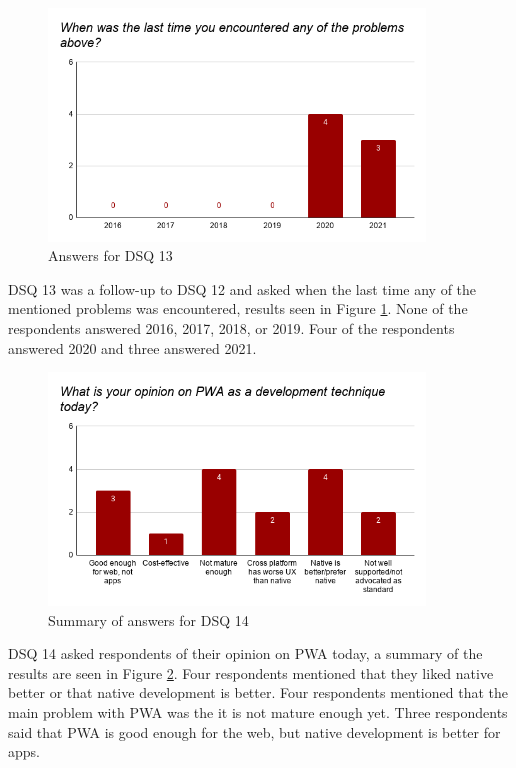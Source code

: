 \documentclass[a4paper,12pt]{article}
\begin{document}
\begin{figure}[ht!]
    \centering
    \includegraphics[width=10cm]{img/Results/dsq13.png}
    \caption{Answers for DSQ 13}
    \label{fig:res_devq13}
\end{figure}

DSQ 13 was a follow-up to DSQ 12 and asked when the last time any of the mentioned problems was encountered, results seen in Figure \ref{fig:res_devq13}. None of the respondents answered 2016, 2017, 2018, or 2019. Four of the respondents answered 2020 and three answered 2021.

\begin{figure}[ht!]
    \centering
    \includegraphics[width=10cm]{img/Results/dsq14.png}
    \caption{Summary of answers for DSQ 14}
    \label{fig:res_devq14}
\end{figure}

\newpage
DSQ 14 asked respondents of their opinion on PWA today, a summary of the results are seen in Figure \ref{fig:res_devq14}. Four respondents mentioned that they liked native better or that native development is better. Four respondents mentioned that the main problem with PWA was the it is not mature enough yet. Three respondents said that PWA is good enough for the web, but native development is better for apps.
\end{document}
